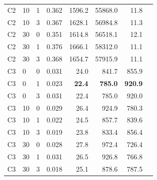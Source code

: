 \documentclass[pdflatex,sn-mathphys-num]{sn-jnl}%
\theoremstyle{thmstyleone}%
\theoremstyle{thmstyletwo}%
\theoremstyle{thmstylethree}%
\begin{document}
\begin{appendices}
\begin{table}
\begin{tabular}{llrrrrrr}
C2 & 10 & 1 & 0.362 & 1596.2 & 55868.0 & 11.8 \\
C2 & 10 & 3 & 0.367 & 1628.1 & 56984.8 & 11.3 \\
C2 & 30 & 0 & 0.351 & 1614.8 & 56518.1 & 12.1 \\
C2 & 30 & 1 & 0.376 & 1666.1 & 58312.0 & 11.1 \\
C2 & 30 & 3 & 0.368 & 1654.7 & 57915.9 & 11.1 \\
\addlinespace[4pt]
C3 & 0 & 0 & 0.031 & 24.0 & 841.7 & 855.9 \\
C3 & 0 & 1 & 0.023 & \textbf{22.4} & \textbf{785.0} & \textbf{920.9} \\
C3 & 0 & 3 & 0.031 & 22.4 & 785.0 & 920.0 \\
C3 & 10 & 0 & 0.029 & 26.4 & 924.9 & 780.3 \\
C3 & 10 & 1 & 0.022 & 24.5 & 857.7 & 839.6 \\
C3 & 10 & 3 & 0.019 & 23.8 & 833.4 & 856.4 \\
C3 & 30 & 0 & 0.028 & 27.8 & 972.4 & 726.4 \\
C3 & 30 & 1 & 0.031 & 26.5 & 926.8 & 766.8 \\
C3 & 30 & 3 & 0.018 & 25.1 & 878.6 & 787.5 \\
\bottomrule
\end{tabular}
\end{table}


\end{appendices}
\end{document}
